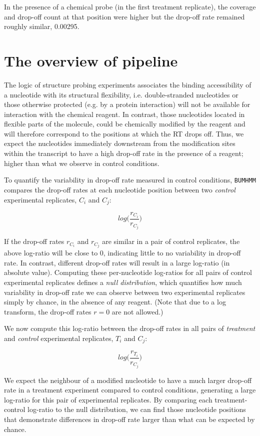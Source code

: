 \documentclass{article}\usepackage[]{graphicx}\usepackage[usenames,dvipsnames]{color}
\begin{document}
In the presence of a chemical probe (in the first treatment replicate), the
coverage and drop-off count at that position were higher but the drop-off rate
remained roughly similar,
0.00295.

\section{The overview of pipeline}

The logic of structure probing experiments associates the binding accessibility
of a nucleotide with its structural flexibility, i.e. double-stranded
nucleotides or those otherwise protected (e.g. by a protein interaction) will
not be available for interaction with the chemical reagent. In contrast, those
nucleotides located in flexible parts of the molecule, could be chemically
modified by the reagent and will therefore correspond to the positions at which
the RT drops off. Thus, we expect the nucleotides immediately downstream from
the modification sites within the transcript to have a high drop-off rate in the
presence of a reagent; higher than what we observe in control conditions.

To quantify the variability in drop-off rate measured in control conditions,
\verb|BUMHMM| compares the drop-off rates at each nucleotide position between
two \textit{control} experimental replicates, ${C_i}$ and ${C_j}$:

\[log \Big( \frac{r_{C_i}}{r_{C_j}} \Big) \]

If the drop-off rates $r_{C_i}$ and $r_{C_j}$ are similar in a pair of control
replicates, the above log-ratio will be close to 0, indicating little
to no variability in drop-off rate. In contrast, different drop-off rates will
result in a large log-ratio (in absolute value). Computing these per-nucleotide
log-ratios for all pairs of control experimental replicates defines a
\textit{null distribution}, which quantifies how much variability in drop-off
rate we can observe between two experimental replicates simply by chance, in the
absence of any reagent. (Note that due to a log transform, the drop-off rates
$r = 0$ are not allowed.)

We now compute this log-ratio between the drop-off rates in all pairs of
\textit{treatment} and \textit{control} experimental replicates, ${T_i}$ and
${C_j}$:

\[log \Big( \frac{r_{T_i}}{r_{C_j}} \Big) \]

We expect the neighbour of a modified nucleotide to have a much larger drop-off
rate in a treatment experiment compared to control conditions, generating a
large log-ratio for this pair of experimental replicates. By comparing each
treatment-control log-ratio to the null distribution, we can find those
nucleotide positions that demonstrate differences in drop-off rate larger than
what can be expected by chance.
\end{document}
